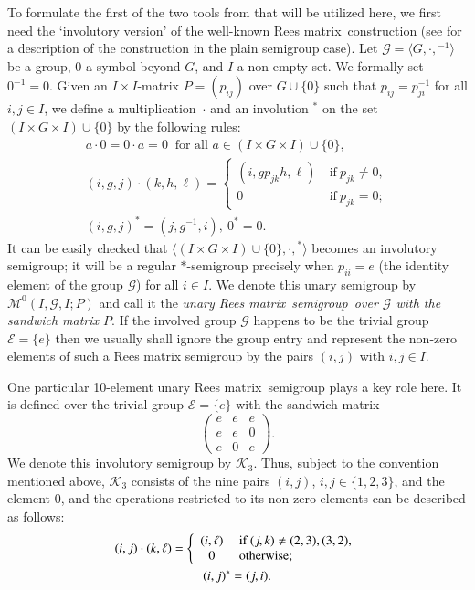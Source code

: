 \documentclass[preprint,1p,times]{elsarticle}
\numberwithin{equation}{section}
\theoremstyle{remark}
\def\cal{\mathcal}
\def\Mc{{\cal M}}
\def\Rm{Rees matrix}
\def\sm{semi\-group}
\begin{document}
To formulate the first of the two tools from \cite{adv} that will be utilized here, we first need the `involutory
version' of the well-known \Rm\ construction (see \cite[Section~3.1]{CP} for a description of the construction in the
plain semigroup case). Let $\mathcal{G}=\langle G,\cdot,{}^{-1}\rangle$ be a group, $0$ a symbol beyond $G$, and $I$ a
non-empty set. We formally set $0^{-1}=0$. Given an $I\times I$-matrix $P=(p_{ij})$ over $G\cup\{0\}$ such that
$p_{ij}=p_{ji}^{-1}$ for all $i,j\in I$, we define a multiplication~$\cdot$ and an involution ${}^*$ on the set
$(I\times G\times I)\cup\{0\}$ by the following rules:
\begin{gather*}
a\cdot 0=0\cdot a=0\ \text{ for all $a\in (I\times G\times I)\cup \{0\}$},\\
(i,g,j)\cdot(k,h,\ell)=\left\{\begin{array}{cl}
(i,gp_{jk}h,\ell)&\ \text{if}\ p_{jk}\ne0,\\
0 &\ \text{if}\ p_{jk}=0;
\end{array}\right.\\
(i,g,j)^* = (j,g^{-1},i),\ 0^* = 0.
\end{gather*}
It can be easily checked that $\langle(I\times G\times I)\cup \{0\},\cdot,{}^*\rangle$ becomes  an involutory
semigroup; it will be a regular $*$-semigroup precisely when $p_{ii}=e$ (the identity element of the group
$\mathcal{G}$) for all $i\in I$. We denote this unary semigroup  by $\Mc^0(I,\mathcal{G},I;P)$ and call it the
\emph{unary \Rm\ \sm\ over $\mathcal{G}$ with the sandwich matrix $P$}. If the involved group $\mathcal G$ happens to
be the trivial group $\mathcal{E}=\{e\}$ then we usually shall ignore the group entry and represent the non-zero
elements of such a Rees matrix semigroup by the pairs $(i,j)$ with $i,j\in I$.

One particular 10-element unary \Rm\ semigroup plays a key role here. It is defined over the trivial group
$\mathcal{E}=\{e\}$ with the sandwich matrix
$$\begin{pmatrix}
e & e & e\\
e & e & 0\\
e & 0 & e
\end{pmatrix}.$$
We denote this involutory semigroup by $\mathcal{K}_3$. Thus, subject to the convention mentioned above,
$\mathcal{K}_3$ consists of the nine pairs $(i,j)$, $i,j\in\{1,2,3\}$, and the element $0$, and the operations
restricted to its non-zero elements can be described as follows:
\begin{gather}
\label{operations in C3} (i,j)\cdot(k,\ell)=\left\{\begin{array}{cl}
(i,\ell)&\ \text{if}\ (j,k)\ne(2,3),(3,2),\\
0 &\ \text{otherwise};
\end{array}\right.\\
(i,j)^* = (j,i)\notag.
\end{gather}
\end{document}
